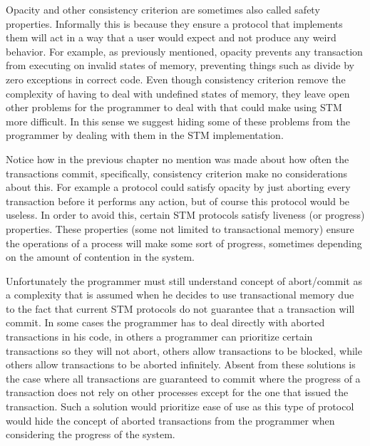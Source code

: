 \documentclass[runningheads,a4paper]{article}
\begin{document}
Opacity and other consistency criterion are sometimes also called safety properties.
Informally this is because they ensure a protocol that implements them will
act in a way that a user would expect and not produce any weird behavior.
For example, as previously mentioned, opacity prevents any transaction from executing on invalid states of memory, preventing
things such as divide by zero exceptions in correct code.
Even though consistency criterion remove the complexity of having to deal with undefined states of memory,
they leave open other problems for the programmer to deal with that could make using STM more difficult.
In this sense we suggest hiding some of these problems from the programmer by dealing with them in the STM
implementation.

Notice how in the previous chapter no mention was made about how often the transactions commit,
specifically, consistency criterion make no considerations about this.
For example a protocol could satisfy opacity by just aborting every transaction before it performs
any action, but of course this protocol would be useless.
In order to avoid this, certain STM protocols satisfy liveness (or progress) properties.
These properties (some not limited to transactional memory) ensure the operations of a process
will make some sort of progress, sometimes depending on the amount of contention in the system.





Unfortunately the programmer must still understand
concept of abort/commit as a complexity that is assumed when he decides to use
transactional memory due to the fact that current STM protocols do not
guarantee that a transaction will commit.
In some cases the programmer has to deal directly with aborted transactions
in his code, in others a programmer can prioritize certain transactions
so they will not abort, others allow transactions to be blocked, while
others allow transactions to be aborted infinitely.
Absent from these solutions is the case where all transactions are guaranteed to
commit where the progress of a transaction does not rely on
other processes except for the one that issued the transaction.
Such a solution would prioritize ease of use as this type of protocol would hide
the concept of aborted transactions from the programmer when considering
the progress of the system.
\end{document}
